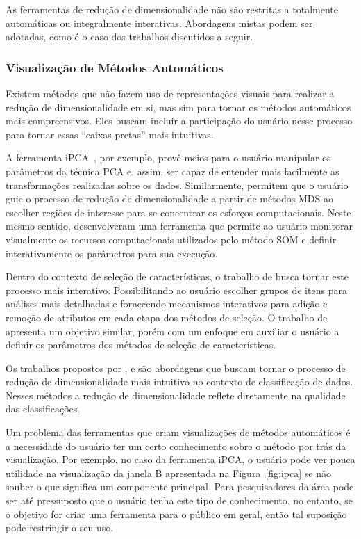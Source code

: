 As ferramentas de redução de dimensionalidade não são
restritas a totalmente automáticas ou integralmente
interativas. Abordagens mistas podem ser adotadas, como é o
caso dos trabalhos discutidos a seguir.

\subsubsection{Visualização de Métodos Automáticos}

Existem métodos que não fazem uso de representações
visuais para realizar a redução de dimensionalidade em si,
mas sim para tornar os métodos automáticos mais
compreensivos. Eles buscam incluir a participação do usuário
nesse processo para tornar essas ``caixas pretas'' mais
intuitivas. 

A ferramenta iPCA~\cite{Jeong2009}, por exemplo, provê meios
para o usuário manipular os parâmetros da técnica PCA e,
assim, ser capaz de entender mais facilmente as
transformações realizadas sobre os dados. Similarmente,
\citet{Williams2004} permitem que o usuário guie o processo
de redução de dimensionalidade a partir de métodos MDS ao
escolher regiões de interesse para se concentrar os esforços
computacionais.  Neste mesmo sentido, \citet{Schreck2008}
desenvolveram uma ferramenta que permite ao usuário
monitorar visualmente os recursos computacionais utilizados
pelo método SOM e definir interativamente os parâmetros para
sua execução.

Dentro do contexto de seleção de características, o trabalho
de \citet{Dy2000} busca tornar este processo mais interativo.
Possibilitando ao usuário escolher grupos de itens para
análises mais detalhadas e fornecendo mecanismos interativos
para adição e remoção de atributos em cada etapa dos métodos
de seleção. O trabalho de \citet{Brandoli2010} apresenta um
objetivo similar, porém com um enfoque em auxiliar o
usuário a definir os parâmetros dos métodos de seleção de
características.

Os trabalhos propostos por \citet{Zhang2006}, \citet{Choo2010}
e \citet{Paiva2012} são abordagens que buscam tornar o
processo de redução de dimensionalidade mais intuitivo no
contexto de classificação de dados. Nesses métodos a redução
de dimensionalidade reflete diretamente na qualidade das
classificações. 

Um problema das ferramentas que criam visualizações de métodos
automáticos é a necessidade do usuário ter um certo
conhecimento sobre o método por trás da visualização. Por
exemplo, no caso da ferramenta iPCA, o usuário pode ver
pouca utilidade na visualização da janela B apresentada na
Figura~\ref{fig:ipca} se não souber o que significa um
componente principal. Para pesquisadores da área pode ser
até pressuposto que o usuário tenha este tipo de
conhecimento, no entanto, se o objetivo for criar uma
ferramenta para o público em geral, então tal suposição pode
restringir o seu uso.

